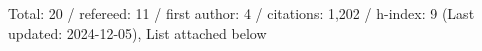 Total: 20 / refereed: 11 / first author: 4 / citations: 1,202 / h-index: 9 (Last updated: 2024-12-05), List attached below